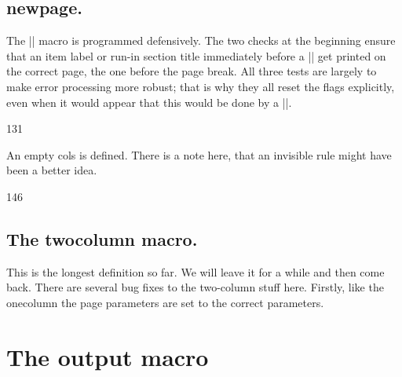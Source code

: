 \subsection{\string newpage.} 

The |\newpage| macro is programmed defensively. The two checks at the beginning ensure that an item label or run-in section title
immediately before a |\newpage| get printed on the correct page, the one before
the page break.
All three tests are largely to make error processing more robust; that is why
they all reset the 
flags explicitly, even when it would appear that this would be
done by a |\leavevmode|.

\begin{teXXX}
131 \def \newpage {%
132  \if@noskipsec
133    \ifx \@nodocument\relax
134      \leavevmode
135      \global \@noskipsecfalse
136    \fi
137 \fi
138 \if@inlabel
139   \leavevmode
140   \global \@inlabelfalse
141 \fi
142 \if@nobreak \@nobreakfalse \everypar{}\fi
143 \par
144 \vfil
145 \penalty -\@M}
\end{teXXX}

An empty cols is defined. There is a note here, that an invisible rule might have been a better idea.

\begin{teXXX}
146 \def \@emptycol {\vbox{}\penalty -\@M}
\end{teXXX}

\subsection{The \string twocolumn macro.} This is the longest definition so far. We will leave it for a while and then come back. There are several bug fixes to the two-column stuff here. Firstly, like the onecolumn the page parameters are set to the correct parameters.


\begin{teXXX}
147 \def \twocolumn {%
148 \clearpage
149 \global\columnwidth\textwidth
150 \global\advance\columnwidth-\columnsep
151 \global\divide\columnwidth\tw@
152 \global\hsize\columnwidth
153 \global\linewidth\columnwidth
154 \global\@twocolumntrue
155 \global\@firstcolumntrue
156 \col@number \tw@
\end{teXXX}



\section{The output macro}


